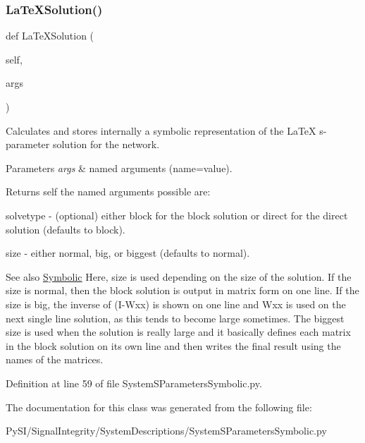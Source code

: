 \subsubsection{\texorpdfstring{La\+Te\+X\+Solution()}{LaTeXSolution()}}
{\footnotesize\ttfamily def La\+Te\+X\+Solution (\begin{DoxyParamCaption}\item[{}]{self,  }\item[{}]{args }\end{DoxyParamCaption})}



Calculates and stores internally a symbolic representation of the La\+TeX s-\/parameter solution for the network. 


\begin{DoxyParams}{Parameters}
{\em args} & named arguments (name=value). \\
\hline
\end{DoxyParams}
\begin{DoxyReturn}{Returns}
self the named arguments possible are\+:
\begin{DoxyItemize}
\item \textquotesingle{}solvetype\textquotesingle{} -\/ (optional) either \textquotesingle{}block\textquotesingle{} for the block solution or \textquotesingle{}direct\textquotesingle{} for the direct solution (defaults to \textquotesingle{}block\textquotesingle{}).
\item \textquotesingle{}size\textquotesingle{} -\/ either \textquotesingle{}normal\textquotesingle{}, \textquotesingle{}big\textquotesingle{}, or \textquotesingle{}biggest\textquotesingle{} (defaults to \textquotesingle{}normal\textquotesingle{}). 
\end{DoxyItemize}
\end{DoxyReturn}
\begin{DoxySeeAlso}{See also}
\hyperlink{namespaceSignalIntegrity_1_1SystemDescriptions_1_1Symbolic}{Symbolic} Here, \textquotesingle{}size\textquotesingle{} is used depending on the size of the solution. If the size is normal, then the block solution is output in matrix form on one line. If the size is big, the inverse of (I-\/\+Wxx) is shown on one line and Wxx is used on the next single line solution, as this tends to become large sometimes. The biggest size is used when the solution is really large and it basically defines each matrix in the block solution on its own line and then writes the final result using the names of the matrices. 
\end{DoxySeeAlso}


Definition at line 59 of file System\+S\+Parameters\+Symbolic.\+py.



The documentation for this class was generated from the following file\+:\begin{DoxyCompactItemize}
\item 
Py\+S\+I/\+Signal\+Integrity/\+System\+Descriptions/System\+S\+Parameters\+Symbolic.\+py\end{DoxyCompactItemize}

